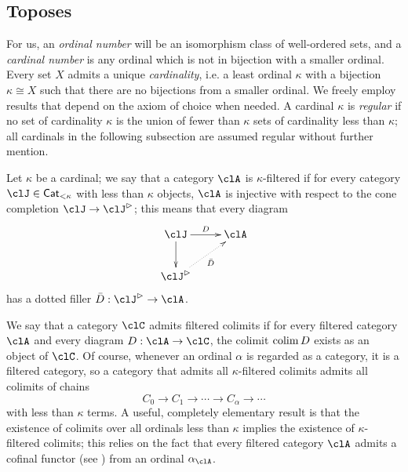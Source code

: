 \subsection{Toposes}\leavevmode
For us, an \emph{ordinal number} will be an isomorphism class of well\hyp{}ordered sets, and a \emph{cardinal number} is any ordinal which is not in bijection with a smaller ordinal. Every set $X$ admits a unique \emph{cardinality}, i.e. a least ordinal $\kappa$ with a bijection $\kappa \cong X$ such that there are no bijections from a smaller ordinal. We freely employ results that depend on the axiom of choice when needed. A cardinal $\kappa$ is \emph{regular} if no set of cardinality $\kappa$ is the union of fewer than $\kappa$ sets of cardinality less than $\kappa$; all cardinals in the following subsection are assumed regular without further mention.

Let $\kappa$ be a cardinal; we say that a category $\clA$ is $\kappa$\hyp{}filtered if for every category $\clJ\in\Qat_{<\kappa}$ with less than $\kappa$ objects, $\clA$ is injective with respect to the cone completion $\clJ\to \clJ^\rhd$; this means that every diagram
\[
	\vcenter{\xymatrix{
			\clJ\ar[d]\ar[r]^D & \clA \\
			\clJ^\rhd\ar@{.>}[ur]_{\bar D}
		}}
\]
has a dotted filler $\bar D : \clJ^\rhd \to \clA$.

We say that a category $\clC$ admits filtered colimits if for every filtered category $\clA$ and every diagram $D : \clA \to \clC$, the colimit $\operatorname{colim} D$ exists as an object of $\clC$. Of course, whenever an ordinal $\alpha$ is regarded as a category, it is a filtered category, so a category that admits all $\kappa$\hyp{}filtered colimits admits all colimits of chains
\[
	C_0 \to C_1 \to \cdots \to C_\alpha \to\cdots
\]
with less than $\kappa$ terms. A useful, completely elementary result is that the existence of colimits over all ordinals less than $\kappa$ implies the existence of $\kappa$\hyp{}filtered colimits; this relies on the fact that every filtered category $\clA$ admits a cofinal functor (see \cite{Bor1}) from an ordinal $\alpha_\clA$.

